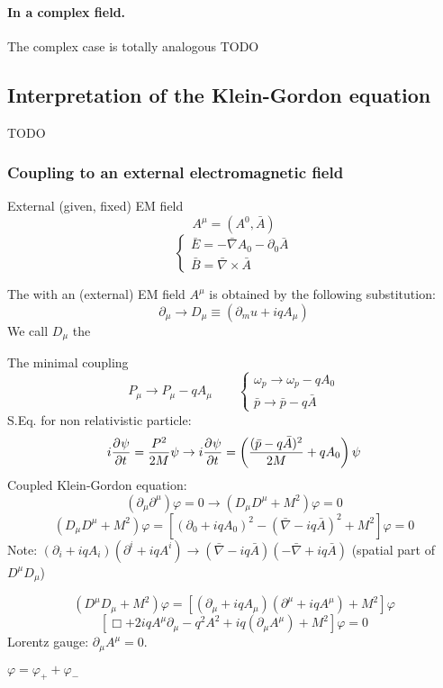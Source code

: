 \paragraph{In a complex field.}
The complex case is totally analogous TODO

\subsection{Interpretation of the Klein-Gordon equation}
TODO

\subsubsection{Coupling to an external electromagnetic field}
External (given, fixed) EM field
\[ A^\mu = (A^0, \bar{A}) \]
\[ \begin{cases}
\bar{E} = -\bar{\nabla}A_0 - \partial_0 \bar{A} \\
\bar{B} = \bar{\nabla}\times\bar{A}
\end{cases} \]
\begin{definition}
The  with an (external) EM field $A^\mu$ is obtained by the following substitution:
\[ \partial_\mu \to D_\mu \equiv (\partial_mu + iqA_\mu) \]
We call $D_\mu$ the  
\end{definition}
The minimal coupling
\[ P_\mu \to P_\mu-qA_\mu \qquad \begin{cases}
\omega_p \to \omega_p - q A_0 \\ \bar{p} \to \bar{p} - q \bar{A}
\end{cases} \]
S.Eq. for non relativistic particle:
\[ i  \frac{\partial{^{}}\psi}{\partial{{t}^{}}}  = \frac{P^2}{2M}\psi \to i \frac{\partial{^{}}\psi}{\partial{{t}^{}}}  = \left(\frac{(\bar{p}-q\bar{A})^2}{2M} +qA_0\right)\psi \]
Coupled Klein-Gordon equation:
\[(\partial_\mu\partial^\mu)\varphi = 0 \to (D_\mu D^\mu + M^2)\varphi = 0 \]
\[ (D_\mu D^\mu + M^2)\varphi = \left[ (\partial_0 + iqA_0)^2 - (\bar{\nabla}-iq\bar{A})^2 + M^2\right]\varphi = 0 \]
Note: $(\partial_i + iqA_i)(\partial^i+ iqA^i) \to (\bar{\nabla}-iq\bar{A})(-\bar{\nabla}+iq\bar{A})$ (spatial part of $D^\mu D_\mu$)

\[ (D^\mu D_\mu + M^2)\varphi = [(\partial_\mu + iqA_\mu)(\partial^\mu+ iqA^\mu)+M^2]\varphi \]
\[ [\Box +2iqA^\mu\partial_\mu - q^2A^2 + iq(\partial_\mu A^\mu) + M^2]\varphi = 0 \]
Lorentz gauge: $\partial_\mu A^\mu = 0$.

$\varphi = \varphi_+ + \varphi_-$


